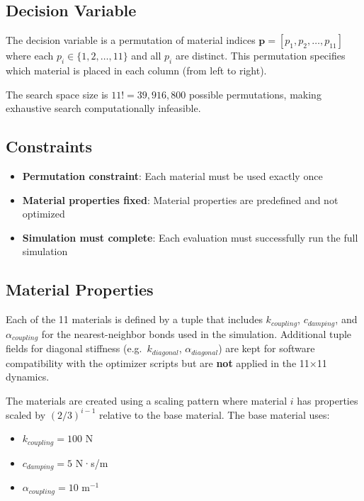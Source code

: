 \documentclass[11pt,a4paper]{article}
\begin{document}
\subsection{Decision Variable}

\noindent The decision variable is a permutation of material indices $\mathbf{p} = [p_1, p_2, \ldots, p_{11}]$ where each $p_i \in \{1, 2, \ldots, 11\}$ and all $p_i$ are distinct. This permutation specifies which material is placed in each column (from left to right). \newline

\noindent The search space size is $11! = 39,916,800$ possible permutations, making exhaustive search computationally infeasible. \newline

\subsection{Constraints}

\begin{itemize}
    \item \textbf{Permutation constraint}: Each material must be used exactly once
    \item \textbf{Material properties fixed}: Material properties are predefined and not optimized
    \item \textbf{Simulation must complete}: Each evaluation must successfully run the full simulation
\end{itemize}

\subsection{Material Properties}

\noindent Each of the 11 materials is defined by a tuple that includes $k_{coupling}$, $c_{damping}$, and $\alpha_{coupling}$ for the nearest-neighbor bonds used in the simulation. Additional tuple fields for diagonal stiffness (e.g.\ $k_{diagonal}$, $\alpha_{diagonal}$) are kept for software compatibility with the optimizer scripts but are \textbf{not} applied in the 11×11 dynamics.

\noindent The materials are created using a scaling pattern where material $i$ has properties scaled by $(2/3)^{i-1}$ relative to the base material. The base material uses:
\begin{itemize}
    \item $k_{coupling} = 100$ N
    \item $c_{damping} = 5$ N·s/m
    \item $\alpha_{coupling} = 10$ m$^{-1}$
\end{itemize}
\end{document}
